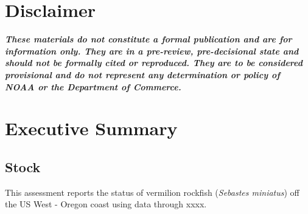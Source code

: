 \documentclass[11pt,
  english,
  a4paper,
]{article}
\begin{document}
\newcommand{\lt}{\ensuremath <}
\newcommand{\gt}{\ensuremath >}

\vspace{500cm}


\hypertarget{disclaimer}{%
\section*{Disclaimer}\label{disclaimer}}

\leavevmode\tagmcend\tagstructend


\emph{\textbf{These materials do not constitute a formal publication and are for information only. They are in a pre-review, pre-decisional state and should not be formally cited or reproduced. They are to be considered provisional and do not represent any determination or policy of NOAA or the Department of Commerce.}}

\leavevmode\tagmcend\tagstructend\par

\pagebreak
{}
\setcounter{page}{1}

\renewcommand{\thetable}{\roman{table}}
\renewcommand{\thefigure}{\roman{figure}}

\setlength\parskip{0.5em plus 0.1em minus 0.2em}


\hypertarget{executive-summary}{%
\section*{Executive Summary}\label{executive-summary}}

\leavevmode\tagmcend\tagstructend


\hypertarget{stock}{%
\subsection*{Stock}\label{stock}}

\leavevmode\tagmcend\tagstructend


This assessment reports the status of vermilion rockfish (\emph{Sebastes miniatus}) off the US West - Oregon coast using data through xxxx.
\end{document}
